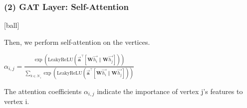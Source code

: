 \documentclass{beamer}
\begin{document}

\begin{frame}[fragile]
\begin{itemize}
\frametitle{(2) GAT Layer: Self-Attention}
[ball]

\item Then, we perform self-attention on the vertices.

\vspace{0.2cm}

\begin{center}
    \item[] $\alpha_{i,j} = \frac{\exp\left(\mathrm{LeakyReLU}\left( \overrightarrow{\mathbf{a}}^{\top}
    [\mathbf{W}\overrightarrow{h_{i}}\|
    \mathbf{W}\overrightarrow{h_{j}}]
\right)\right)}
{\sum_{k \in \mathcal{N}_{i}}
\exp\left(\mathrm{LeakyReLU}\left(
\overrightarrow{\mathbf{a}}^{\top}
    [\mathbf{W}\overrightarrow{h_{i}}\|
    \mathbf{W}\overrightarrow{h_{j}}]
\right)\right)}$
\end{center}

\vspace{0.5cm}

\item The attention coefficients $\alpha_{i,j}$ indicate the importance of vertex j’s features to vertex i.

\end{itemize}
\end{frame}

\end{document}
